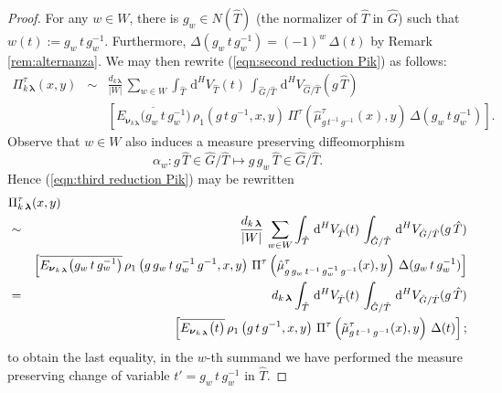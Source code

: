 \documentclass[12pt,a4paper]{article}
\theoremstyle{plain}
\theoremstyle{definition}
\begin{document}
\begin{proof}
For any $w\in W$, there is $g_w\in N(\hat{T})$ (the normalizer of
$\hat{T}$ in $\hat{G}$) such that
$w(t):=g_w\,t\,g_w^{-1}$. Furthermore,
$\Delta(g_w\,t\,g_w^{-1})=(-1)^w\,\Delta(t)$ by Remark \ref{rem:alternanza}.
We may then rewrite (\ref{eqn:second reduction Pik}) as follows:
\begin{eqnarray}
\label{eqn:third reduction Pik}
\Pi^\tau_{k\,\boldsymbol{\lambda}}(x,y)&\sim&
\frac{d_{k\,\boldsymbol{\lambda}}}{|W|}\,\sum_{w\in W}
\int_{\hat{T}}\,\mathrm{d}^HV_{\hat{T}}(t)\,\int_{\hat{G}/\hat{T}}
\,\mathrm{d}^HV_{\hat{G}/\hat{T}}(g\,\hat{T})\\
&&\left[\overline{E_{\boldsymbol{\nu}_{k\,\boldsymbol{\lambda}}}
\big(g_w\,t\,g_w^{-1}\big)}
\,\rho_1\left(g\,t\,g^{-1},x,y\right)\,
\Pi^\tau
\left(\hat{\mu}^\tau_{g\,t^{-1}\,g^{-1}}(x),y   \right)
\,\Delta(g_w\,t\,g_w^{-1})\right].\nonumber
\end{eqnarray}
Observe that $w\in W$ also induces a measure preserving diffeomorphism 
$$\alpha_w:g\,\hat{T}\in \hat{G}/\hat{T}\mapsto
g\,g_w\,\hat{T}\in\hat{G}/\hat{T}.$$
Hence (\ref{eqn:third reduction Pik}) may be rewritten
\begin{eqnarray}
\label{eqn:4th reduction Pik}
\lefteqn{\Pi^\tau_{k\,\boldsymbol{\lambda}}(x,y)}\\
&\sim&\nonumber
\frac{d_{k\,\boldsymbol{\lambda}}}{|W|}\,\sum_{w\in W}
\int_{\hat{T}}\,\mathrm{d}^HV_{\hat{T}}(t)\,\int_{\hat{G}/\hat{T}}
\,\mathrm{d}^HV_{\hat{G}/\hat{T}}(g\,\hat{T})\\
&&\left[\overline{E_{\boldsymbol{\nu}_{k\,\boldsymbol{\lambda}}}
\big(g_w\,t\,g_w^{-1}\big)}
\,\rho_1\left(g\,g_w\,t\,g_w^{-1}\,g^{-1},x,y\right)\,
\Pi^\tau
\left(\hat{\mu}^\tau_{g\,g_w\,t^{-1}\,g_w^{-1}\,g^{-1}}(x),y   \right)
\,\Delta(g_w\,t\,g_w^{-1})\right]\nonumber\\
&=&\nonumber
d_{k\,\boldsymbol{\lambda}}
\int_{\hat{T}}\,\mathrm{d}^HV_{\hat{T}}(t)\,\int_{\hat{G}/\hat{T}}
\,\mathrm{d}^H V_{\hat{G}/\hat{T}}(g\,\hat{T})\\
&&\left[\overline{E_{\boldsymbol{\nu}_{k\,\boldsymbol{\lambda}}}
\big(t\big)}
\,\rho_1\left(g\,t\,g^{-1},x,y\right)\,
\Pi^\tau
\left(\tilde{\mu}^\tau_{g\,t^{-1}\,g^{-1}}(x),y   \right)
\,\Delta(t)\right];\nonumber
\end{eqnarray}
to obtain the last equality, in the $w$-th summand we have performed
the measure preserving change of variable 
$t'=g_w\,t\,g_w^{-1}$ in $\hat{T}$.


\end{proof}
\end{document}
